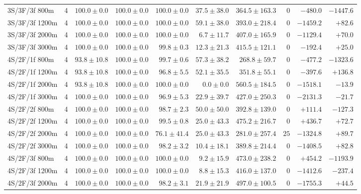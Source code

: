 \begin{tabular}{l r r r r r r r r r}
3S/3F/3f 800m & 4 & $100.0 \pm 0.0$ & $100.0 \pm 0.0$ & $100.0 \pm 0.0$ & $37.5 \pm 38.0$ & $364.5 \pm 163.3$ & $0$ & $-480.0$ & $-1447.6$ \\
3S/3F/3f 1200m & 4 & $100.0 \pm 0.0$ & $100.0 \pm 0.0$ & $100.0 \pm 0.0$ & $59.1 \pm 38.0$ & $393.0 \pm 218.4$ & $0$ & $-1459.2$ & $+82.6$ \\
3S/3F/3f 2000m & 4 & $100.0 \pm 0.0$ & $100.0 \pm 0.0$ & $100.0 \pm 0.0$ & $6.7 \pm 11.7$ & $407.0 \pm 165.9$ & $0$ & $-1129.4$ & $+70.0$ \\
3S/3F/3f 3000m & 4 & $100.0 \pm 0.0$ & $100.0 \pm 0.0$ & $99.8 \pm 0.3$ & $12.3 \pm 21.3$ & $415.5 \pm 121.1$ & $0$ & $-192.4$ & $+25.0$ \\
4S/2F/1f 800m & 4 & $93.8 \pm 10.8$ & $100.0 \pm 0.0$ & $99.7 \pm 0.6$ & $57.3 \pm 38.2$ & $268.8 \pm 59.7$ & $0$ & $-477.2$ & $-1323.6$ \\
4S/2F/1f 1200m & 4 & $93.8 \pm 10.8$ & $100.0 \pm 0.0$ & $96.8 \pm 5.5$ & $52.1 \pm 35.5$ & $351.8 \pm 55.1$ & $0$ & $-397.6$ & $+136.8$ \\
4S/2F/1f 2000m & 4 & $93.8 \pm 10.8$ & $100.0 \pm 0.0$ & $100.0 \pm 0.0$ & $0.0 \pm 0.0$ & $560.5 \pm 184.5$ & $0$ & $-1518.1$ & $-13.9$ \\
4S/2F/1f 3000m & 4 & $100.0 \pm 0.0$ & $100.0 \pm 0.0$ & $96.9 \pm 5.3$ & $22.9 \pm 39.7$ & $427.0 \pm 250.3$ & $0$ & $-2131.3$ & $-21.7$ \\
4S/2F/2f 800m & 4 & $100.0 \pm 0.0$ & $100.0 \pm 0.0$ & $98.7 \pm 2.3$ & $50.0 \pm 50.0$ & $392.8 \pm 139.0$ & $0$ & $+111.4$ & $-127.3$ \\
4S/2F/2f 1200m & 4 & $100.0 \pm 0.0$ & $100.0 \pm 0.0$ & $99.5 \pm 0.8$ & $25.0 \pm 43.3$ & $475.2 \pm 216.7$ & $0$ & $+436.7$ & $+72.7$ \\
4S/2F/2f 2000m & 4 & $100.0 \pm 0.0$ & $100.0 \pm 0.0$ & $76.1 \pm 41.4$ & $25.0 \pm 43.3$ & $281.0 \pm 257.4$ & $25$ & $-1324.8$ & $+89.7$ \\
4S/2F/2f 3000m & 4 & $100.0 \pm 0.0$ & $100.0 \pm 0.0$ & $98.2 \pm 3.2$ & $10.4 \pm 18.1$ & $389.8 \pm 214.4$ & $0$ & $-1408.5$ & $+82.8$ \\
4S/2F/3f 800m & 4 & $100.0 \pm 0.0$ & $100.0 \pm 0.0$ & $100.0 \pm 0.0$ & $9.2 \pm 15.9$ & $473.0 \pm 238.2$ & $0$ & $+454.2$ & $-1193.9$ \\
4S/2F/3f 1200m & 4 & $100.0 \pm 0.0$ & $100.0 \pm 0.0$ & $100.0 \pm 0.0$ & $8.8 \pm 15.3$ & $416.0 \pm 137.0$ & $0$ & $-1412.6$ & $-237.4$ \\
4S/2F/3f 2000m & 4 & $100.0 \pm 0.0$ & $100.0 \pm 0.0$ & $98.2 \pm 3.1$ & $21.9 \pm 21.9$ & $497.0 \pm 100.5$ & $0$ & $-1755.3$ & $+44.5$ \\

\end{tabular}
